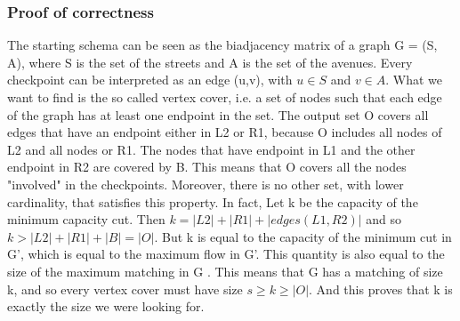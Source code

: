 \subsubsection{Proof of correctness}
The starting schema can be seen as the biadjacency matrix of a graph G = (S, A), where S is the set of the streets and A is the set of the avenues. Every checkpoint can be interpreted as an edge (u,v), with $u \in S$ and $v \in A$. What we want to find is the so called vertex cover, i.e. a set of nodes such that each edge of the graph has at least one endpoint in the set.
The output set O covers all edges that have an endpoint either in L2 or R1, because O includes all nodes of L2 and all nodes or R1. The nodes that have endpoint in L1 and the other endpoint in R2 are covered by B. This means that O covers all the nodes "involved" in the checkpoints. Moreover, there is no other set, with lower cardinality, that satisfies this property. In fact, Let k be the capacity of the minimum capacity cut. Then $k = |L2| + |R1| + |edges(L1,R2)|$ and so $k > |L2| + |R1| + |B| = |O|$. But k is equal to the capacity of the minimum cut in G', which is equal to the maximum flow in G'. This quantity  is also equal to the size of the maximum matching in G \cite{Konig}. This means that G has a matching of size k, and so every vertex cover must have size $s \geq k \geq |O|$. And this proves that k is exactly the size we were looking for.